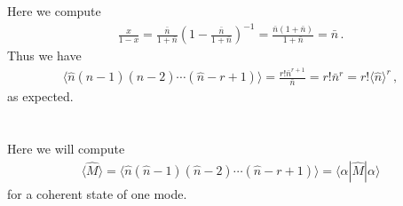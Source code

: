 \documentclass[11pt, oneside]{book}
\theoremstyle{break}
\theoremstyle{break}
\begin{document}
Here we compute
\begin{align*}
\frac{x}{1-x} = \frac{\bar{n}}{1+\bar{n}}\left(1-\frac{\bar{n}}{1+\bar{n}}\right)^{-1} = 
\frac{\bar{n}(1+\bar{n})}{1+\bar{n}} = \bar{n}\,.
\end{align*}
Thus we have
\begin{align*}
 \langle \hat{n}(\hat{n}-1)(\hat{n}-2)\cdots (\hat{n}-r+1)\rangle = \frac{r! \bar{n}^{r+1}}{\bar{n}} = r! \bar{n}^r = r! \langle \hat{n}\rangle^r\,,
\end{align*}
as expected. 

\chapter{}
Here we will compute
\begin{align*}
\langle \hat{M}\rangle= \langle \hat{n}(\hat{n}-1)(\hat{n}-2)\cdots (\hat{n}-r+1)\rangle=\langle \alpha |\hat{M}|\alpha \rangle
\end{align*}
for a coherent state of one mode.\\
\end{document}
